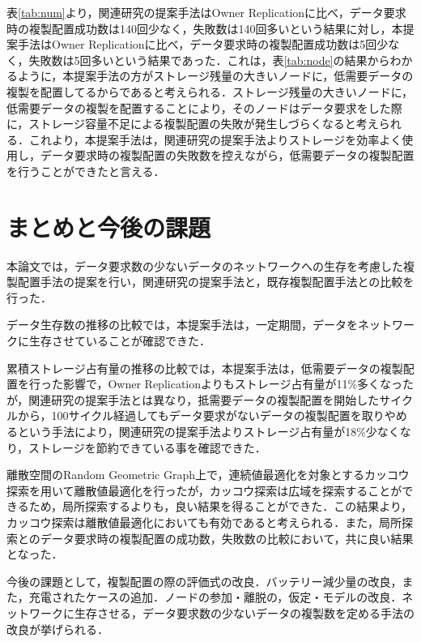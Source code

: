 \documentclass[11pt]{jreport}
\begin{document}
\par 表\ref{tab:num}より，関連研究の提案手法はOwner Replicationに比べ，データ要求時の複製配置成功数は140回少なく，失敗数は140回多いという結果に対し，本提案手法はOwner Replicationに比べ，データ要求時の複製配置成功数は5回少なく，失敗数は5回多いという結果であった．これは，表\ref{tab:node}の結果からわかるように，本提案手法の方がストレージ残量の大きいノードに，低需要データの複製を配置してるからであると考えられる．ストレージ残量の大きいノードに，低需要データの複製を配置することにより，そのノードはデータ要求をした際に，ストレージ容量不足による複製配置の失敗が発生しづらくなると考えられる．これより，本提案手法は，関連研究の提案手法よりストレージを効率よく使用し，データ要求時の複製配置の失敗数を控えながら，低需要データの複製配置を行うことができたと言える．

\chapter{まとめと今後の課題}
本論文では，データ要求数の少ないデータのネットワークへの生存を考慮した複製配置手法の提案を行い，関連研究の提案手法と，既存複製配置手法との比較を行った．
\par データ生存数の推移の比較では，本提案手法は，一定期間，データをネットワークに生存させていることが確認できた．
\par 累積ストレージ占有量の推移の比較では，本提案手法は，低需要データの複製配置を行った影響で，Owner Replicationよりもストレージ占有量が11\%多くなったが，関連研究の提案手法とは異なり，抵需要データの複製配置を開始したサイクルから，100サイクル経過してもデータ要求がないデータの複製配置を取りやめるという手法により，関連研究の提案手法よりストレージ占有量が18\%少なくなり，ストレージを節約できている事を確認できた．
\par 離散空間のRandom Geometric Graph上で，連続値最適化を対象とするカッコウ探索を用いて離散値最適化を行ったが，カッコウ探索は広域を探索することができるため，局所探索するよりも，良い結果を得ることができた．この結果より，カッコウ探索は離散値最適化においても有効であると考えられる．また，局所探索とのデータ要求時の複製配置の成功数，失敗数の比較において，共に良い結果となった．
\par 今後の課題として，複製配置の際の評価式の改良．バッテリー減少量の改良，また，充電されたケースの追加．ノードの参加・離脱の，仮定・モデルの改良．ネットワークに生存させる，データ要求数の少ないデータの複製数を定める手法の改良が挙げられる．



\end{document}
